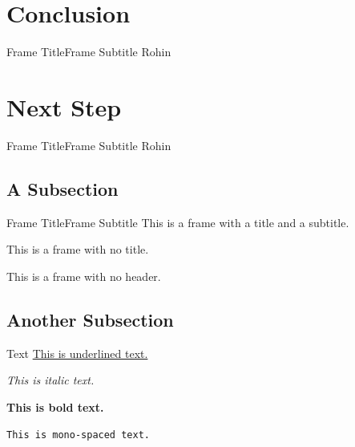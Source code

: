 \documentclass{beamer}
\begin{document}
\section{Conclusion}

\begin{frame}{Frame Title}{Frame Subtitle}
        Rohin

    \end{frame}

\section{Next Step}

\begin{frame}{Frame Title}{Frame Subtitle}
        Rohin

    \end{frame}

\subsection{A Subsection}

    \begin{frame}{Frame Title}{Frame Subtitle}
        This is a frame with a title and a subtitle.

    \end{frame}

    \begin{frame}{\null}
        This is a frame with no title.
    \end{frame}

    \begin{frame}
        This is a frame with no header.
    \end{frame}

\subsection{Another Subsection}

    \begin{frame}{Text}
        \underline{This is underlined text.}

        \textit{This is italic text.}

        \textbf{This is bold text.}

        \texttt{This is mono-spaced text.}
    \end{frame}
\end{document}
